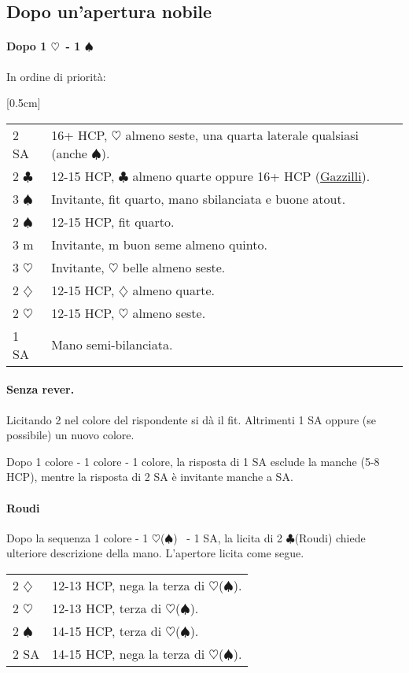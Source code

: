 \documentclass[a4paper,10pt]{article}
\renewcommand{\c}{$\clubsuit$\xspace}
\renewcommand{\d}{$\diamondsuit$\xspace}
\newcommand{\h}{$\heartsuit$\xspace}
\newcommand{\s}{$\spadesuit$\xspace}
\newcommand{\sa}{SA\xspace}
\newcommand{\m}{m\xspace}
\newcommand{\smallspace}{\vskip0.3cm}
\renewcommand{\tabcolsep}{0.3cm}
\newenvironment{twocol}
  {\smallspace\noindent\begin{tabular}{l p{0.78\textwidth}}}
  {\end{tabular}\smallspace}
\newcommand{\biddingtable}[1]{
  \marginnote{
    \scriptsize{
    \def\arraystretch{1.5}
    \renewcommand{\tabcolsep}{0.1cm}
    \begin{tabular}{|>{\centering\arraybackslash}p{0.6cm}>{\centering\arraybackslash}p{0.6cm}>{\centering\arraybackslash}p{0.6cm}>{\centering\arraybackslash}p{0.6cm}|}
      \hline
      #1
    \end{tabular}
    }
  }[0.5cm]
}
\begin{document}
\subsection{Dopo un'apertura nobile}

\paragraph{Dopo 1 \h\ - 1 \s} In ordine di priorità:
\biddingtable{1 \h & P & 1 \s & P \\ * & & &}
\begin{twocol}
 2 \sa & 16+ HCP, \h almeno seste, una quarta laterale qualsiasi (anche \s).\\
 2 \c & 12-15 HCP, \c almeno quarte oppure 16+ HCP (\hyperref[gazzilli]{Gazzilli}).\\
 3 \s & Invitante, fit quarto, mano sbilanciata e buone atout.\\
 2 \s & 12-15 HCP, fit quarto.\\
 3 \m & Invitante, \m buon seme almeno quinto.\\
 3 \h & Invitante, \h belle almeno seste.\\
 2 \d & 12-15 HCP, \d almeno quarte.\\
 2 \h & 12-15 HCP, \h almeno seste.\\
 1 \sa & Mano semi-bilanciata.
\end{twocol}





\paragraph{Senza rever.} Licitando 2 nel colore del rispondente si dà il fit. Altrimenti 1 \sa oppure (se possibile) un nuovo colore.

Dopo 1 colore - 1 colore - 1 colore, la risposta di 1 \sa esclude la manche (5-8 HCP), mentre la risposta di 2 \sa è invitante manche a \sa.

\paragraph{Roudi} Dopo la sequenza 1 colore - 1 \h (\s) \ - 1 \sa, la licita di 2 \c (Roudi) chiede ulteriore descrizione della mano. L'apertore licita come segue.
\begin{twocol}
	2 \d & 12-13 HCP, nega la terza di \h (\s).\\
	2 \h & 12-13 HCP, terza di \h (\s).\\
	2 \s & 14-15 HCP, terza di \h (\s).\\
	2 \sa & 14-15 HCP, nega la terza di \h (\s).
\end{twocol}
\end{document}
